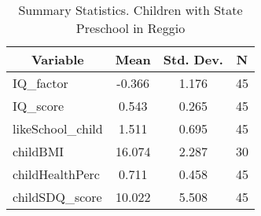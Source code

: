 
\begin{table}[htbp]\centering \caption{Summary Statistics. Children with State Preschool in Reggio \label{bothChildmaternaStatReggio}}
\begin{tabular}{l c c  c}\hline\hline
\multicolumn{1}{c}{\textbf{Variable}} & \textbf{Mean}
 & \textbf{Std. Dev.} & \textbf{N}\\ \hline
IQ\_factor & -0.366 & 1.176  & 45\\
IQ\_score & 0.543 & 0.265  & 45\\
likeSchool\_child & 1.511 & 0.695  & 45\\
childBMI & 16.074 & 2.287  & 30\\
childHealthPerc & 0.711 & 0.458  & 45\\
childSDQ\_score & 10.022 & 5.508  & 45\\
\hline\end{tabular}
\end{table}
